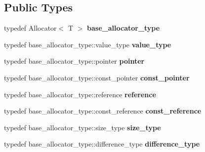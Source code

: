 \subsection*{Public Types}
\begin{DoxyCompactItemize}
\item 
\hypertarget{classdebug__allocator_a5a93be1f2c6c2753d4825091f17854d0}{}typedef Allocator$<$ T $>$ {\bfseries base\+\_\+allocator\+\_\+type}\label{classdebug__allocator_a5a93be1f2c6c2753d4825091f17854d0}

\item 
\hypertarget{classdebug__allocator_a9cb88e02ecc0b5e053f4602fefce0c24}{}typedef base\+\_\+allocator\+\_\+type\+::value\+\_\+type {\bfseries value\+\_\+type}\label{classdebug__allocator_a9cb88e02ecc0b5e053f4602fefce0c24}

\item 
\hypertarget{classdebug__allocator_a5b1346f2fb912f9486d59b7bedb58f3d}{}typedef base\+\_\+allocator\+\_\+type\+::pointer {\bfseries pointer}\label{classdebug__allocator_a5b1346f2fb912f9486d59b7bedb58f3d}

\item 
\hypertarget{classdebug__allocator_a2c533c34a6c42edef7b09e1491115a7a}{}typedef base\+\_\+allocator\+\_\+type\+::const\+\_\+pointer {\bfseries const\+\_\+pointer}\label{classdebug__allocator_a2c533c34a6c42edef7b09e1491115a7a}

\item 
\hypertarget{classdebug__allocator_ab138e1c13d9d68d683b80e1774982593}{}typedef base\+\_\+allocator\+\_\+type\+::reference {\bfseries reference}\label{classdebug__allocator_ab138e1c13d9d68d683b80e1774982593}

\item 
\hypertarget{classdebug__allocator_aacd526eca6c9c7449df9864b9ab7523f}{}typedef base\+\_\+allocator\+\_\+type\+::const\+\_\+reference {\bfseries const\+\_\+reference}\label{classdebug__allocator_aacd526eca6c9c7449df9864b9ab7523f}

\item 
\hypertarget{classdebug__allocator_ab49f7dea9dd575692c3b3ff19487832d}{}typedef base\+\_\+allocator\+\_\+type\+::size\+\_\+type {\bfseries size\+\_\+type}\label{classdebug__allocator_ab49f7dea9dd575692c3b3ff19487832d}

\item 
\hypertarget{classdebug__allocator_a2e7084a121bfbd48976d96ff2a3f69da}{}typedef base\+\_\+allocator\+\_\+type\+::difference\+\_\+type {\bfseries difference\+\_\+type}\label{classdebug__allocator_a2e7084a121bfbd48976d96ff2a3f69da}

\end{DoxyCompactItemize}
